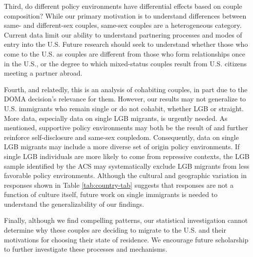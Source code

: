 \documentclass[
  12pt,
]{article}
\begin{document}
Third, do different policy environments have differential effects based on couple composition? While our primary motivation is to understand differences between same- and different-sex couples, same-sex couples are a heterogeneous category. Current data limit our ability to understand partnering processes and modes of entry into the U.S. Future research should seek to understand whether those who come to the U.S. as couples are different from those who form relationships once in the U.S., or the degree to which mixed-status couples result from U.S. citizens meeting a partner abroad.

Fourth, and relatedly, this is an analysis of cohabiting couples, in part due to the DOMA decision's relevance for them. However, our results may not generalize to U.S. immigrants who remain single or do not cohabit, whether LGB or straight. More data, especially data on single LGB migrants, is urgently needed. As mentioned, supportive policy environments may both be the result of and further reinforce self-disclosure and same-sex coupledom. Consequently, data on single LGB migrants may include a more diverse set of origin policy environments. If single LGB individuals are more likely to come from repressive contexts, the LGB sample identified by the ACS may systematically exclude LGB migrants from less favorable policy environments. Although the cultural and geographic variation in responses shown in Table \ref{tab:country-tab} suggests that responses are not a function of culture itself, future work on single immigrants is needed to understand the generalizability of our findings.

Finally, although we find compelling patterns, our statistical investigation cannot determine why these couples are deciding to migrate to the U.S. and their motivations for choosing their state of residence. We encourage future scholarship to further investigate these processes and mechanisms.
\end{document}
